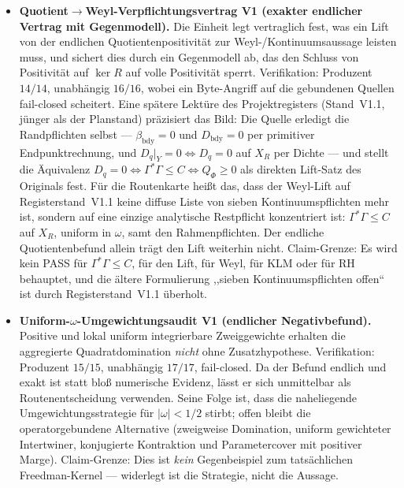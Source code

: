 \documentclass[12pt,a4paper]{article}
\theoremstyle{definition}
\theoremstyle{remark}
\begin{document}
\begin{itemize}
  \item \textbf{Quotient$\to$Weyl-Verpflichtungsvertrag V1 (exakter
    endlicher Vertrag mit Gegenmodell).} Die Einheit legt vertraglich fest,
    was ein Lift von der endlichen Quotientenpositivität zur
    Weyl-/Kontinuumsaussage leisten muss, und sichert dies durch ein
    Gegenmodell ab, das den Schluss von Positivität auf $\ker R$ auf volle
    Positivität sperrt. Verifikation: Produzent $14/14$, unabhängig
    $16/16$, wobei ein Byte-Angriff auf die gebundenen Quellen fail-closed
    scheitert. Eine spätere Lektüre des Projektregisters (Stand~V1.1,
    jünger als der Planstand) präzisiert das Bild: Die Quelle erledigt die
    Randpflichten selbst --- $\beta_{\mathrm{bdy}} = 0$ und
    $D_{\mathrm{bdy}} = 0$ per primitiver Endpunktrechnung, und
    $D_q|_Y = 0 \Longleftrightarrow D_q = 0$ auf $X_R$ per Dichte --- und
    stellt die Äquivalenz
    $D_q = 0 \Longleftrightarrow \Gamma^*\Gamma \le C
    \Longleftrightarrow Q_\Phi \ge 0$ als direkten Lift-Satz des Originals
    fest. Für die Routenkarte heißt das, dass der Weyl-Lift auf
    Registerstand~V1.1 keine diffuse Liste von sieben Kontinuumspflichten
    mehr ist, sondern auf eine einzige analytische Restpflicht konzentriert
    ist: $\Gamma^*\Gamma \le C$ auf $X_R$, uniform in $\omega$, samt den
    Rahmenpflichten. Der endliche Quotientenbefund allein trägt den Lift
    weiterhin nicht. Claim-Grenze: Es wird kein PASS für
    $\Gamma^*\Gamma \le C$, für den Lift, für Weyl, für KLM oder für RH
    behauptet, und die ältere Formulierung ,,sieben Kontinuumspflichten
    offen`` ist durch Registerstand~V1.1 überholt.

  \item \textbf{Uniform-$\omega$-Umgewichtungsaudit V1 (endlicher
    Negativbefund).} Positive und lokal uniform integrierbare
    Zweiggewichte erhalten die aggregierte Quadratdomination \emph{nicht}
    ohne Zusatzhypothese. Verifikation: Produzent $15/15$, unabhängig
    $17/17$, fail-closed. Da der Befund endlich und exakt ist statt bloß
    numerische Evidenz, lässt er sich unmittelbar als Routenentscheidung
    verwenden. Seine Folge ist, dass die naheliegende
    Umgewichtungsstrategie für $|\omega| < 1/2$ stirbt; offen bleibt die
    operatorgebundene Alternative (zweigweise Domination, uniform
    gewichteter Intertwiner, konjugierte Kontraktion und Parametercover mit
    positiver Marge). Claim-Grenze: Dies ist \emph{kein} Gegenbeispiel zum
    tatsächlichen Freedman-Kernel --- widerlegt ist die Strategie, nicht
    die Aussage.


\end{itemize}
\end{document}
